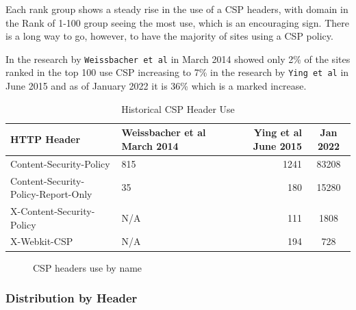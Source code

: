 \documentclass{mscreport}
\begin{document}
\newpage

\vspace{0.3cm} \noindent
Each rank group shows a steady rise in the use of a CSP headers, with domain in the Rank of 1-100 group seeing the most use, which is an encouraging sign. There is a long way to go, however, to have the majority of sites using a CSP policy.

\vspace{0.3cm} \noindent
In the research by \texttt{Weissbacher et al} \cite{Weissbacher2014-vm} in March 2014 showed only 2\% of the sites ranked in the top 100 use CSP increasing to 7\% in the research by \texttt{Ying et al} \cite{Ying2016-ag} in June 2015 and as of January 2022 it is 36\% which is a marked increase.

\begin{table}[t]
\footnotesize
  \begin{center}
    \begin{tabular}{|l|I|D|c|}  %
      \hline
      \textbf{HTTP Header} & \textbf{Weissbacher et al} \cite{Weissbacher2014-vm} March 2014 & \textbf{Ying et al} \cite{Ying2016-ag} June 2015 & Jan 2022 \\
      \hline
      Content-Security-Policy & 815 & 1241 & 83208\\
      \hline
      Content-Security-Policy-Report-Only & 35 & 180 & 15280\\
      \hline
      X-Content-Security-Policy & N/A & 111 & 1808\\
      \hline
      X-Webkit-CSP & N/A & 194 & 728\\
      \hline
    \end{tabular}
    \caption{Historical CSP Header Use}
    \label{table:csp_header_count} %
  \end{center}
\end{table}

\begin{figure}[H]
	\begin{center}
		\caption{CSP headers use by name}
		\label{fig:csp_by_rank}
	\end{center}
\end{figure}

\subsubsection{Distribution by Header}
\end{document}
